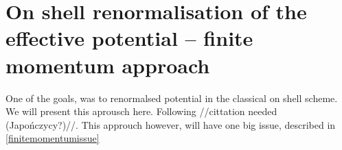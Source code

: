 \chapter{On shell renormalisation of the effective potential -- finite momentum approach}
One of the goals, was to renormalsed potential in the classical on shell scheme. 
We will present this aprousch here. Following //cittation needed (Japończycy?)//.
This approuch however, will have one big issue, described in \ref{finitemomentumissue}
